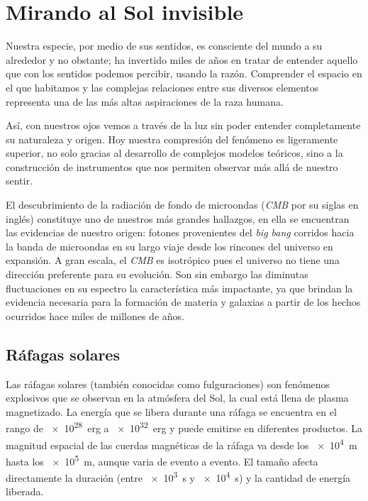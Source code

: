 
\chapter{Mirando al Sol invisible}
\label{chap:uno}

Nuestra especie, por medio de sus sentidos, es consciente del mundo a su alrededor y no obstante; ha invertido miles de años en tratar de entender aquello que con los sentidos podemos percibir, usando la razón. Comprender el espacio en el que habitamos y las complejas relaciones entre sus diversos elementos representa una de las más altas aspiraciones de la raza humana.

Así, con nuestros ojos vemos a través de la luz sin poder entender completamente su naturaleza y origen. Hoy nuestra compresión del fenómeno es ligeramente superior, no solo gracias al desarrollo de complejos modelos teóricos, sino a la construcción de instrumentos que nos permiten observar más allá de nuestro sentir.

El descubrimiento de la radiación de fondo de microondas (\emph{CMB} por su siglas en inglés) constituye uno de nuestros más grandes hallazgos, en ella se encuentran las evidencias de nuestro origen: fotones provenientes del \emph{big bang} corridos hacia la banda de microondas en su largo viaje desde los rincones del universo en expansión. A gran escala, el \emph{CMB} es isotrópico pues el universo no tiene una dirección preferente para su evolución. Son sin embargo las diminutas fluctuaciones en su espectro la característica más impactante, ya que brindan la evidencia necesaria para la formación de materia y galaxias a partir de los hechos ocurridos hace miles de millones de años.

\section{Ráfagas solares}

Las ráfagas solares (también conocidas como fulguraciones) son fenómenos explosivos que se observan en la atmósfera del Sol, la cual está llena de plasma magnetizado. La energía que se libera durante una ráfaga se encuentra en el rango de \SI{e28}{erg} a \SI{e32}{erg} y puede emitirse en diferentes productos. La magnitud espacial de las cuerdas magnéticas de la ráfaga va desde los \SI{e4}{\metre} hasta los \SI{e5}{\metre}, aunque varia de evento a evento. El tamaño afecta directamente la duración (entre \SI{e3}{\second} y \SI{e4}{\second}) y la cantidad de energía liberada.

